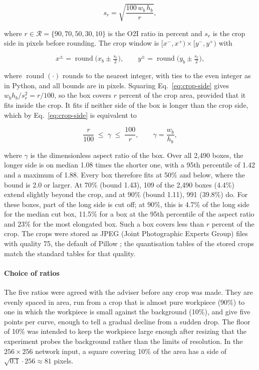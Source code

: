 \begin{equation}
s_r = \sqrt{\frac{100\, w_b\, h_b}{r}},
\label{eq:crop-side}
\end{equation}

where $r \in \mathcal{R} = \{90, 70, 50, 30, 10\}$ is the O2I ratio in percent and
$s_r$ is the crop side in pixels before rounding. The crop window is
$[x^-, x^+) \times [y^-, y^+)$ with

\begin{equation}
x^{\pm} = \operatorname{round}\!\big(x_b \pm \tfrac{s_r}{2}\big), \qquad
y^{\pm} = \operatorname{round}\!\big(y_b \pm \tfrac{s_r}{2}\big),
\label{eq:crop-window}
\end{equation}

where $\operatorname{round}(\cdot)$ rounds to the nearest integer, with ties to the
even integer as in Python, and all bounds are in pixels. Squaring
Eq.~\eqref{eq:crop-side} gives $w_b h_b / s_r^2 = r/100$, so the box covers $r$
percent of the crop area, provided that it fits inside the crop. It fits if neither
side of the box is longer than the crop side, which by Eq.~\eqref{eq:crop-side} is
equivalent to

\begin{equation}
\frac{r}{100} \;\le\; \gamma \;\le\; \frac{100}{r}, \qquad \gamma = \frac{w_b}{h_b},
\label{eq:box-contained}
\end{equation}

where $\gamma$ is the dimensionless aspect ratio of the box. Over all 2,490 boxes, the
longer side is on median 1.08 times the shorter one, with a 95th percentile of 1.42
and a maximum of 1.88. Every box therefore fits at 50\% and below, where the bound is
2.0 or larger. At 70\% (bound 1.43), 109 of the 2,490 boxes (4.4\%) extend slightly
beyond the crop, and at 90\% (bound 1.11), 991 (39.8\%) do. For these boxes, part of the long side is cut off; at
90\%, this is 4.7\% of the long side for the median cut box, 11.5\% for a box at the
95th percentile of the aspect ratio and 23\% for the most elongated box. Such a box covers less than $r$ percent of the crop. The crops were stored as
JPEG (Joint Photographic Experts Group) files with quality 75, the default of
Pillow \citep{pillow2025docs}; the quantisation tables of the stored crops match the
standard tables for that quality.

\paragraph{Choice of ratios}
The five ratios were agreed with the adviser before any crop was made. They are
evenly spaced in area, run from a crop that is almost pure workpiece (90\%) to one in which
the workpiece is small against the background (10\%), and give five points per curve,
enough to tell a gradual decline from a sudden drop. The floor of 10\% was intended
to keep the workpiece large enough after resizing that the experiment probes the
background rather than the limits of resolution. In the $256 \times 256$ network
input, a square covering 10\% of the area has a side of
$\sqrt{0.1} \cdot 256 \approx 81$ pixels.

